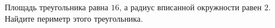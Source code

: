 \begin{ex}
	\begin{condition}
		Площадь треугольника равна \( 16 \), а радиус вписанной окружности равен \( 2 \). Найдите периметр этого треугольника.
	\end{condition}
\end{ex}